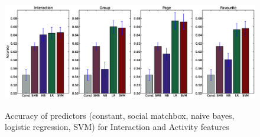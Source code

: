 \begin{figure}[t!]
\centering
\includegraphics[width=230mm, height=50mm]{data/plots/accuracy/accuracy.eps}
\caption{ Accuracy of predictors (constant, social matchbox, naive bayes, logistic regression, SVM) for Interaction and Activity  features }
\label{Fig1}
\end{figure}
